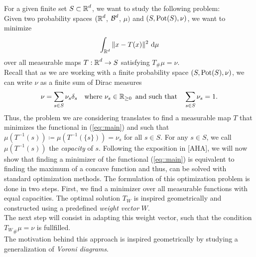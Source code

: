\documentclass[
     12pt,         %
     a4paper,      %
     BCOR=10mm,     %
     DIV=14,        %
     ]{scrreprt}
\begin{document}
    
     


    
    
    For a given finite set $S \subset \operatorname{\mathbb{R}}^d$, we want to study the following problem: \\ 
    Given two probability spaces $(\operatorname{\mathbb{R}}^d$, $\operatorname{\mathcal{B}}^d$, $\mu)$ and $(S, \operatorname{Pot}(S), \nu)$, we want to minimize 
    \begin{align} \label{eq::main}
        \int_{\operatorname{\mathbb{R}}^d} \|x-T(x) \|^2 \ {\operatorname{{\mathrm{d}}}} \mu  
    \end{align}
    over all measurable maps $T: \operatorname{\mathbb{R}}^d \to S$ satisfying $T_{\#}\mu = \nu$. \\%
    Recall that as we are working with a finite probability space $(S, \operatorname{Pot}(S), \nu)$, we can write $\nu$ as a finite sum of Dirac measures
    \begin{align} \label{eq::dirac} 
        \nu = \sum_{s\in S} {\nu_s \delta_{s}} \quad \text{where   } \nu_s \in \operatorname{\mathbb{R}}_{\ge 0} \text{   and such that} \quad \sum_{s \in S}{\nu_s} = 1. 
    \end{align}
    Thus, the problem we are considering translates to find a measurable map $T$ that minimizes the functional in (\ref{eq::main}) and such that 
    $\mu(T^{-1}(s)) \coloneqq \mu(T^{-1}(\{s\})) = \nu_s $  for all $s\in S$. For any $s\in S$, we call $\mu(T^{-1}(s))$  the \textit{capacity} of $s$.
    \indent Following the exposition in [AHA], we will now show that finding a minimizer of the functional (\ref{eq::main}) is equivalent to finding the maximum of a concave function and thus, can be solved with
    standard optimization methods. The formulation of this optimization problem is done in two steps.
    First, we find a minimizer over all measurable functions with equal capacities. The optimal solution $T_W$ is inspired geometrically and constructed using 
    a predefined \textit{weight vector}  $W$.\\
    The next step will consist in adapting this weight vector, such that the condition ${T_{W}}_{\#}\mu = \nu$ is fullfilled.\\ 
    The motivation behind this approach is inspired geometrically by studying a generalization of \textit{Voroni diagrams}. 
\end{document}
